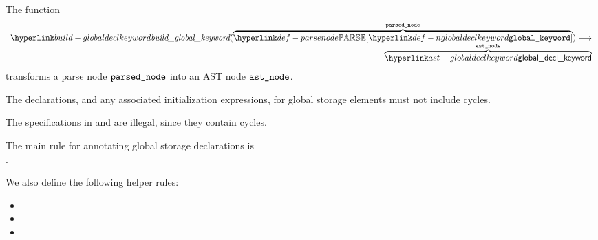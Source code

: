 \hypertarget{build-globaldeclkeyword}{}
The function
\[
\begin{array}{r}
\buildglobaldeclkeyword(\overname{\parsenode{\Nglobaldeclkeyword}}{\vparsednode}) \aslto \\
  \overname{\globaldeclkeyword}{\vastnode}
\end{array}
\]
transforms a parse node $\vparsednode$ into an AST node $\vastnode$.

\begin{mathpar}
\end{mathpar}

\begin{mathpar}
\end{mathpar}


 
The declarations, and any associated initialization expressions, for global storage elements must not include cycles.

The specifications in  and 
are illegal, since they contain cycles.

The main rule for annotating global storage declarations is \\
.

We also define the following helper rules:
\begin{itemize}
  \item {}
  \item {}
  \item {}
\end{itemize}

